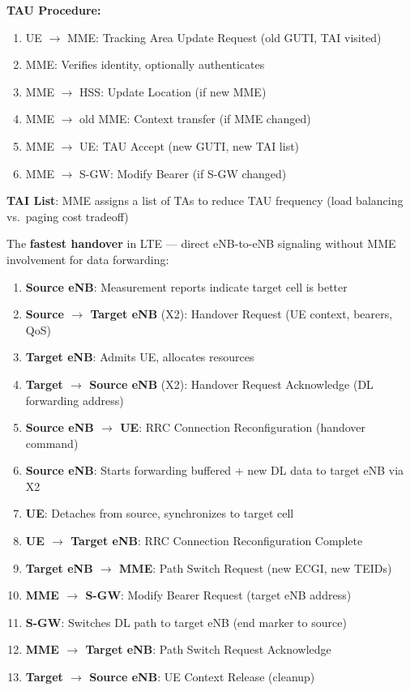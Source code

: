 \textbf{TAU Procedure:}

\begin{enumerate}
\def\labelenumi{\arabic{enumi}.}
\tightlist
\item
  UE \ensuremath{\to} MME: Tracking Area Update Request (old GUTI, TAI visited)
\item
  MME: Verifies identity, optionally authenticates
\item
  MME \ensuremath{\to} HSS: Update Location (if new MME)
\item
  MME \ensuremath{\to} old MME: Context transfer (if MME changed)
\item
  MME \ensuremath{\to} UE: TAU Accept (new GUTI, new TAI list)
\item
  MME \ensuremath{\to} S-GW: Modify Bearer (if S-GW changed)
\end{enumerate}

\textbf{TAI List}: MME assigns a list of TAs to reduce TAU frequency (load balancing vs. paging cost tradeoff)


The \textbf{fastest handover} in LTE — direct eNB-to-eNB signaling without MME involvement for data forwarding:

\begin{enumerate}
\def\labelenumi{\arabic{enumi}.}
\tightlist
\item
  \textbf{Source eNB}: Measurement reports indicate target cell is better
\item
  \textbf{Source \ensuremath{\to} Target eNB} (X2): Handover Request (UE context, bearers, QoS)
\item
  \textbf{Target eNB}: Admits UE, allocates resources
\item
  \textbf{Target \ensuremath{\to} Source eNB} (X2): Handover Request Acknowledge (DL forwarding address)
\item
  \textbf{Source eNB \ensuremath{\to} UE}: RRC Connection Reconfiguration (handover command)
\item
  \textbf{Source eNB}: Starts forwarding buffered + new DL data to target eNB via X2
\item
  \textbf{UE}: Detaches from source, synchronizes to target cell
\item
  \textbf{UE \ensuremath{\to} Target eNB}: RRC Connection Reconfiguration Complete
\item
  \textbf{Target eNB \ensuremath{\to} MME}: Path Switch Request (new ECGI, new TEIDs)
\item
  \textbf{MME \ensuremath{\to} S-GW}: Modify Bearer Request (target eNB address)
\item
  \textbf{S-GW}: Switches DL path to target eNB (end marker to source)
\item
  \textbf{MME \ensuremath{\to} Target eNB}: Path Switch Request Acknowledge
\item
  \textbf{Target \ensuremath{\to} Source eNB}: UE Context Release (cleanup)
\end{enumerate}

